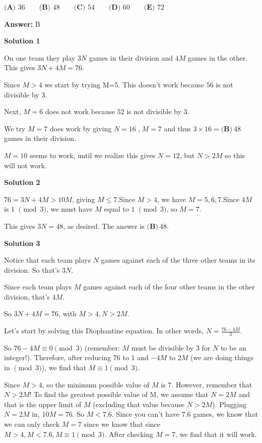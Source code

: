 \begin{enumerate}
 $\textbf{(A) } 36 \qquad \textbf{(B) } 48 \qquad \textbf{(C) } 54 \qquad \textbf{(D) } 60 \qquad \textbf{(E) } 72$

 \textbf{Answer: }B



\textbf{Solution 1}

On one team they play $3N$ games in their division and $4M$ games in the other.  This gives $3N+4M=76$.

 Since $M>4$ we start by trying M=5. This doesn't work because $56$ is not divisible by $3$.

 Next, $M=6$ does not work because $52$ is not divisible by $3$.

 We try $M=7$ does work by giving $N=16$ ,$~M=7$ and thus $3\times 16=\boxed{\textbf{(B)}~48}$ games in their division.

 $M=10$ seems to work, until we realize this gives $N=12$, but $N>2M$ so this will not work.

 



\textbf{Solution 2}

$76=3N+4M > 10M$, giving $M \le 7$.Since $M>4$, we have $M=5,6,7$.Since $4M$ is $1$ $\pmod{3}$, we must have $M$ equal to $1$ $\pmod{3}$, so $M=7$.

 This gives $3N=48$, as desired. The answer is $\boxed{\textbf{(B)}~48}$.

 



\textbf{Solution 3}

Notice that each team plays $N$ games against each of the three other teams in its division. So that's $3N$.

 Since each team plays $M$ games against each of the four other teams in the other division, that's $4M$.

 So $3N+4M=76$, with $M>4, N>2M$. 

 Let's start by solving this Diophantine equation. In other words, $N=\frac{76-4M}{3}$. 

 So $76-4M\equiv0 \pmod{3}$ (remember: $M$ must be divisible by 3 for $N$ to be an integer!). Therefore, after reducing $76$ to $1$ and $-4M$ to $2M$ (we are doing things in $\pmod{3}$), we find that $M\equiv1 \pmod{3}$. 

 Since $M>4$, so the minimum possible value of $M$ is $7$. However, remember that $N>2M$! To find the greatest possible value of M, we assume that $N=2M$ and that is the upper limit of $M$ (excluding that value because $N>2M$). Plugging $N=2M$ in, $10M=76$. So $M<7.6$. Since you can't have $7.6$ games, we know that we can only check $M=7$ since we know that since $M>4, M<7.6, M\equiv1 \pmod{3}$. After checking $M=7$, we find that it will work.


\end{enumerate}
